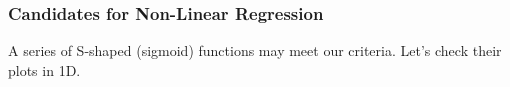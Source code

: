 \documentclass[10pt,aspectratio=169]{beamer}
\begin{document}
\begin{frame}
  \frametitle{Candidates for Non-Linear Regression}

  A series of S-shaped (sigmoid) functions may meet our
  criteria. Let's check their plots in 1D.
  \vfill
  \begin{figure}[t]
  \end{figure}
\end{frame}
\end{document}

